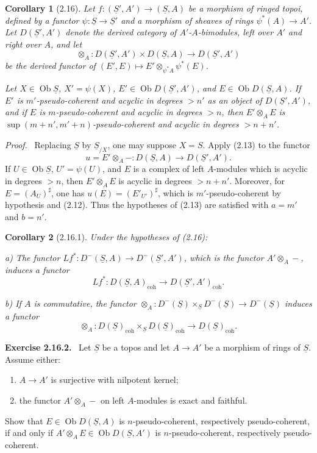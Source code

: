 \documentclass[11pt]{article}
\theoremstyle{plain}
\newtheorem*{corollary*}{Corollary}
\theoremstyle{definition}
\theoremstyle{remark}
\newenvironment{statement}[1]{\par\medskip\noindent\textbf{#1.}\ }{\par\medskip}
\newenvironment{prooftext}{\par\noindent\textit{Proof.}\ }{\par\medskip}
\DeclareMathOperator{\ob}{Ob}
\providecommand{\uS}{\underline{S}}
\begin{document}
\begin{corollary*}[2.16]
Let $f:(\uS',A')\to(\uS,A)$ be a morphism of ringed topoi, defined by a functor $\psi:\uS\to\uS'$ and a morphism of sheaves of rings $\psi^*(A)\to A'$. Let $D(\uS',A')$ denote the derived category of $A'$-$A$-bimodules, left over $A'$ and right over $A$, and let
\[
\otimes_A:D(\uS',A')\times D(\uS,A)\longrightarrow D(\uS',A')
\]
be the derived functor of $(E',E)\mapsto E'\otimes_{\psi^*A}\psi^*(E)$.

Let $X\in\ob\uS$, $X'=\psi(X)$, $E'\in\ob D(\uS',A')$, and $E\in\ob D(\uS,A)$. If $E'$ is $m'$-pseudo-coherent and acyclic in degrees $>n'$ as an object of $D(\uS',A')$, and if $E$ is $m$-pseudo-coherent and acyclic in degrees $>n$, then $E'\otimes_AE$ is $\sup(m+n',m'+n)$-pseudo-coherent and acyclic in degrees $>n+n'$.
\end{corollary*}

\begin{prooftext}
Replacing $\uS$ by $\uS_{/X}$, one may suppose $X=S$. Apply (2.13) to the functor
\[
u=E'\otimes_A -:D(\uS,A)\longrightarrow D(\uS',A').
\]
If $U\in\ob\uS$, $U'=\psi(U)$, and $E$ is a complex of left $A$-modules which is acyclic in degrees $>n$, then $E'\otimes_AE$ is acyclic in degrees $>n+n'$. Moreover, for $E=(A_U)^\sharp$, one has $u(E)=(E'_{U'})^\sharp$, which is $m'$-pseudo-coherent by hypothesis and (2.12). Thus the hypotheses of (2.13) are satisfied with $a=m'$ and $b=n'$.
\end{prooftext}

\begin{corollary*}[2.16.1]
Under the hypotheses of (2.16):

\textup{a)} The functor $Lf^*:D^-(\uS,A)\to D^-(\uS',A')$, which is the functor $A'\otimes_A-$, induces a functor
\[
Lf^*:D(\uS,A)_{\mathrm{coh}}\longrightarrow D(\uS',A')_{\mathrm{coh}}.
\]

\textup{b)} If $A$ is commutative, the functor $\otimes_A:D^-(\uS)\times_{\uS}D^-(\uS)\to D^-(\uS)$ induces a functor
\[
\otimes_A:D(\uS)_{\mathrm{coh}}\times_{\uS}D(\uS)_{\mathrm{coh}}\longrightarrow D(\uS)_{\mathrm{coh}}.
\]
\end{corollary*}

\begin{statement}{Exercise 2.16.2}
Let $\uS$ be a topos and let $A\to A'$ be a morphism of rings of $\uS$. Assume either:
\begin{enumerate}[label=(\roman*)]
\item $A\to A'$ is surjective with nilpotent kernel;
\item the functor $A'\otimes_A-$ on left $A$-modules is exact and faithful.
\end{enumerate}
Show that $E\in\ob D(\uS,A)$ is $n$-pseudo-coherent, respectively pseudo-coherent, if and only if $A'\otimes_AE\in\ob D(\uS,A')$ is $n$-pseudo-coherent, respectively pseudo-coherent.
\end{statement}
\end{document}
